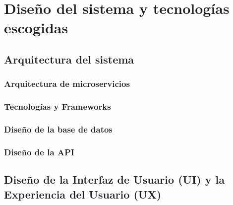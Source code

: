 \chapter{Diseño del sistema y tecnologías escogidas}\label{cap:disenio}

\section{Arquitectura del sistema}

\subsection{Arquitectura de microservicios}

\subsection{Tecnologías y Frameworks}

\subsection{Diseño de la base de datos}

\subsection{Diseño de la API}

\section{Diseño de la Interfaz de Usuario (UI) y la Experiencia del Usuario (UX)}

